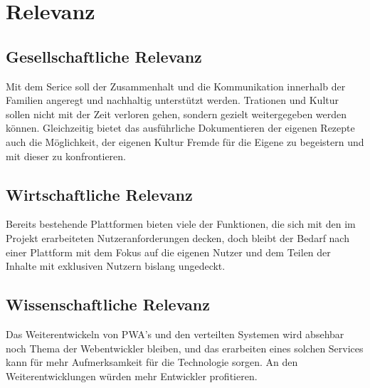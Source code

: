 \documentclass[10pt]{article}
\begin{document}
    \section{Relevanz}\label{sec:Relevanz}

        \subsection{Gesellschaftliche Relevanz}\label{sec:Gesellschaftliche}
        Mit dem Serice soll der Zusammenhalt und die Kommunikation innerhalb der Familien angeregt und nachhaltig unterstützt werden. Trationen und Kultur sollen nicht mit der Zeit verloren gehen, sondern gezielt weitergegeben werden können. Gleichzeitig bietet das ausführliche Dokumentieren der eigenen Rezepte auch die Möglichkeit, der eigenen Kultur Fremde für die Eigene zu begeistern und mit dieser zu konfrontieren.

        \subsection{Wirtschaftliche Relevanz}\label{sec:Wirtschaftliche}
        Bereits bestehende Plattformen bieten viele der Funktionen, die sich mit den im Projekt erarbeiteten Nutzeranforderungen decken, doch bleibt der Bedarf nach einer Plattform mit dem Fokus auf die eigenen Nutzer und dem Teilen der Inhalte mit exklusiven Nutzern bislang ungedeckt.

        \subsection{Wissenschaftliche Relevanz}\label{sec:Wissenschaftliche}
        Das Weiterentwickeln von PWA's und den verteilten Systemen wird absehbar noch Thema der Webentwickler bleiben, und das erarbeiten eines solchen Services kann für mehr Aufmerksamkeit für die Technologie sorgen. An den Weiterentwicklungen würden mehr Entwickler profitieren.
\end{document}
